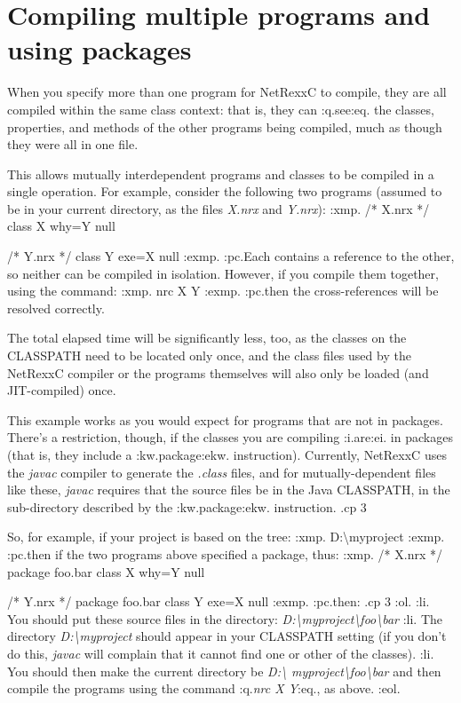 \section{Compiling multiple programs and using packages}

When you specify more than one program for NetRexxC to compile, they are
all compiled within the same class context: that is, they can :q.see:eq.
the classes, properties, and methods of the other programs being
compiled, much as though they were all in one file.

This allows mutually interdependent programs and classes to be compiled
in a single operation.  For example, consider the following two programs
(assumed to be in your current directory, as the files \emph{X.nrx}
and \emph{Y.nrx}):
:xmp.
/* X.nrx */
class X
  why=Y null

/* Y.nrx */
class Y
  exe=X null
:exmp.
:pc.Each contains a reference to the other, so neither can be compiled in
isolation.  However, if you compile them together, using the command:
:xmp.
nrc X Y
:exmp.
:pc.then the cross-references will be resolved correctly.

The total elapsed time will be significantly less, too, as the classes
on the CLASSPATH need to be located only once, and the class files used
by the NetRexxC compiler or the programs themselves will also only be
loaded (and JIT-compiled) once.

This example works as you would expect for programs that are not in
packages.  There's a restriction, though, if the classes you are
compiling :i.are:ei. in packages (that is, they include a
:kw.package:ekw. instruction).  Currently, NetRexxC uses the \emph{javac}
compiler to generate the \emph{.class} files, and for mutually-dependent
files like these, \emph{javac} requires that the source files be in the
Java CLASSPATH, in the sub-directory described by the :kw.package:ekw.
instruction.
.cp 3

So, for example, if your project is based on the tree:
:xmp.
D:\textbackslash myproject
:exmp.
:pc.then if the two programs above specified a package, thus:
:xmp.
/* X.nrx */
package foo.bar
class X
  why=Y null

/* Y.nrx */
package foo.bar
class Y
  exe=X null
:exmp.
:pc.then:
.cp 3
:ol.
:li.
You should put these source files in the directory:
\emph{D:\textbackslash myproject\textbackslash foo\textbackslash bar}
:li.
The directory \emph{D:\textbackslash myproject} should appear in your CLASSPATH
setting (if you don't do this, \emph{javac} will complain that it cannot
find one or other of the classes).
:li.
You should then make the current directory be \emph{D:\textbackslash
myproject\textbackslash foo\textbackslash bar}
and then compile the programs using the command :q.\emph{nrc X Y}:eq.,
as above.
:eol.

